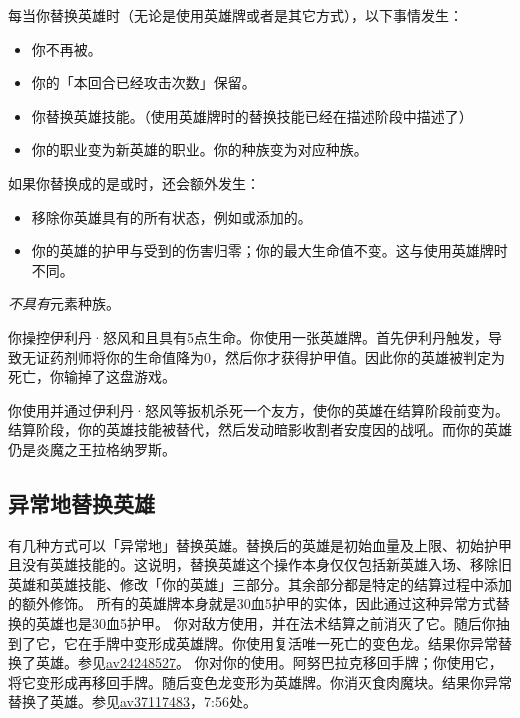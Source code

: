 每当你替换英雄时（无论是使用英雄牌或者是其它方式），以下事情发生：
\begin{itemize}
    \item 你不再被。
    \item 你的「本回合已经攻击次数」保留。
    \item 你替换英雄技能。（使用英雄牌时的替换技能已经在描述阶段中描述了）
    \item 你的职业变为新英雄的职业。你的种族变为对应种族。
\end{itemize}

如果你替换成的是或时，还会额外发生：

\begin{itemize}
    \item 移除你英雄具有的所有状态，例如或添加的。
    \item 你的英雄的护甲与受到的伤害归零；你的最大生命值不变。这与使用英雄牌时不同。
\end{itemize}

\notice {}\emph{不具有}元素种族。

\example 你操控伊利丹·怒风和且具有5点生命。你使用一张英雄牌。首先伊利丹触发，导致无证药剂师将你的生命值降为0，然后你才获得护甲值。因此你的英雄被判定为死亡，你输掉了这盘游戏。

\example 你使用并通过伊利丹·怒风等扳机杀死一个友方，使你的英雄在结算阶段前变为。结算阶段，你的英雄技能被替代，然后发动暗影收割者安度因的战吼。而你的英雄仍是炎魔之王拉格纳罗斯。

\subsection{异常地替换英雄}
有几种方式可以「异常地」替换英雄。替换后的英雄是初始血量及上限、初始护甲且没有英雄技能的。这说明，替换英雄这个操作本身仅仅包括新英雄入场、移除旧英雄和英雄技能、修改「你的英雄」三部分。其余部分都是特定的结算过程中添加的额外修饰。
\notice 所有的英雄牌本身就是30血5护甲的实体，因此通过这种异常方式替换的英雄也是30血5护甲。
\example {} 你对敌方使用，并在法术结算之前消灭了它。随后你抽到了它，它在手牌中变形成英雄牌。你使用复活唯一死亡的变色龙。结果你异常替换了英雄。参见\href{https://www.bilibili.com/video/av24248527}{av24248527}。
\example 你对你的使用。阿努巴拉克移回手牌；你使用它，将它变形成再移回手牌。随后变色龙变形为英雄牌。你消灭食肉魔块。结果你异常替换了英雄。参见\href{https://www.bilibili.com/video/av37117483}{av37117483}，7:56处。


